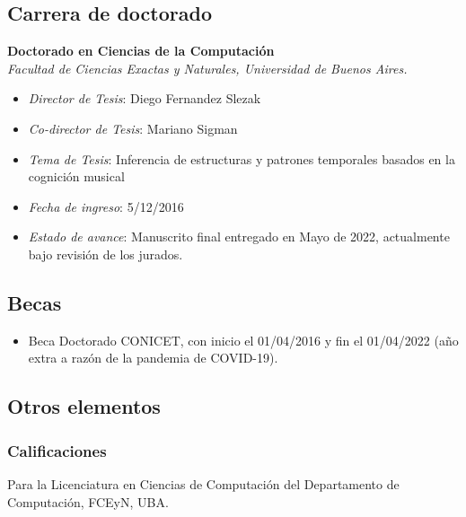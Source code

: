 \documentclass[a4paper,10pt]{article}
\begin{document}
\subsection{Carrera de doctorado}

\textbf{Doctorado en Ciencias de la Computación}\\
\indent{}\emph{Facultad de Ciencias Exactas y Naturales, Universidad de Buenos Aires.}
\begin{itemize}
    \item \emph{Director de Tesis}: Diego Fernandez Slezak
    \item \emph{Co-director de Tesis}: Mariano Sigman
    \item \emph{Tema de Tesis}: Inferencia de estructuras y patrones temporales
        basados en la cognición musical
    \item \emph{Fecha de ingreso}: 5/12/2016
    \item \emph{Estado de avance}: Manuscrito final entregado en Mayo de 2022,
      actualmente bajo revisión de los jurados.
\end{itemize}

\subsection{Becas}

\begin{itemize}
    \item Beca Doctorado CONICET, con inicio el 01/04/2016 y fin el 01/04/2022
      (año extra a razón de la pandemia de COVID-19).
\end{itemize}

\subsection{Otros elementos}

\subsubsection{Calificaciones}

Para la Licenciatura en Ciencias de Computación del Departamento de
Computación, FCEyN, UBA.
\end{document}

